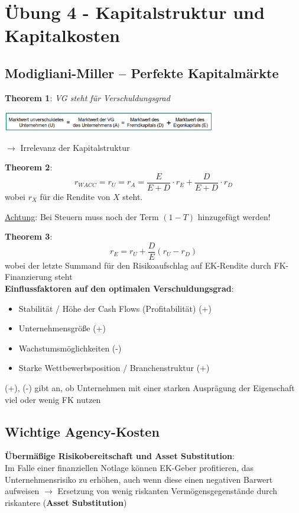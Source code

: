 \section{Übung 4 - Kapitalstruktur und Kapitalkosten}

\subsection{Modigliani-Miller – Perfekte Kapitalmärkte}

\textbf{Theorem 1}: \textit{VG steht für Verschuldungsgrad}
\begin{center}
	\includegraphics[width=0.7\textwidth]{images/e7.png}
\end{center}
$\rightarrow$ Irrelevanz der Kapitalstruktur

\textbf{Theorem 2}: 
$$r_{WACC}=r_U=r_A=\frac{E}{E+D}\cdot r_E+\frac{D}{E+D}\cdot r_D$$
wobei $r_X$ für die Rendite von $X$ steht.

\underline{Achtung}: Bei Steuern muss noch der Term $(1-T)$ hinzugefügt werden!

\textbf{Theorem 3}:
$$r_E=r_U+\frac{D}{E}(r_U-r_D)$$
wobei der letzte Summand für den Risikoaufschlag auf EK-Rendite durch FK-Finanzierung steht\\

\textbf{Einflussfaktoren auf den optimalen Verschuldungsgrad}:
\begin{itemize}
	\item Stabilität / Höhe der Cash Flows (Profitabilität) (+)
	\item Unternehmensgröße (+)
	\item Wachstumsmöglichkeiten (-)
	\item Starke Wettbewerbsposition / Branchenstruktur (+)
\end{itemize}
(+), (-) gibt an, ob Unternehmen mit einer starken Ausprägung der Eigenschaft viel oder wenig FK nutzen

\subsection{Wichtige Agency-Kosten}
\textbf{Übermäßige Risikobereitschaft und Asset Substitution}:\\
Im Falle einer finanziellen Notlage können EK-Geber profitieren,  das Unternehmensrisiko zu erhöhen, auch wenn diese einen negativen Barwert aufweisen $\rightarrow$ Ersetzung von wenig riskanten Vermögensgegenstände durch riskantere (\textbf{Asset Substitution})

